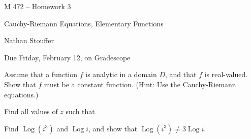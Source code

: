 \documentclass[11pt]{exam}
\DeclareMathOperator{\Log}{Log}
\begin{document}
\centerline{\Large M 472 -- Homework 3}
\vspace{2ex}
\centerline{\Large Cauchy-Riemann Equations, Elementary Functions}
\vspace{1ex}
\centerline{Nathan Stouffer}
\vspace{3ex}
\centerline{Due Friday, February 12, on Gradescope}
\vspace{3ex}
\thispagestyle{empty}
\begin{questions}
  \question Assume that a function $f$ is analytic in a domain $D$,
  and that $f$ is real-valued. Show that $f$ must be a constant
  function. (Hint: Use the Cauchy-Riemann equations.)

  \question Find all values of $z$ such that

  \question Find $\Log(i^3)$ and $\Log i$, and show that $\Log(i^3)
  \ne 3 \Log i$.

  \question

  \question
\end{questions}
\end{document}
